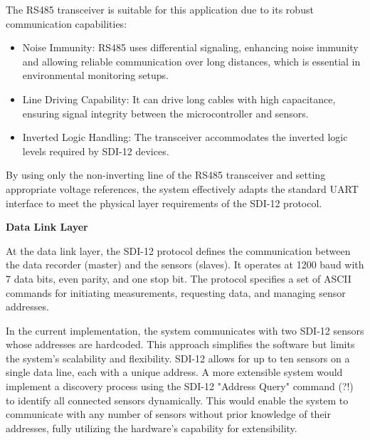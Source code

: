 The RS485 transceiver is suitable for this application due to its robust communication capabilities:

\begin{itemize}
    \item Noise Immunity: RS485 uses differential signaling, enhancing noise immunity and allowing 
    reliable communication over long distances, which is essential in environmental monitoring setups.
    \item Line Driving Capability: It can drive long cables with high capacitance, ensuring signal 
    integrity between the microcontroller and sensors.
    \item Inverted Logic Handling: The transceiver accommodates the inverted logic levels required by SDI-12 devices.
\end{itemize}

By using only the non-inverting line of the RS485 transceiver and setting appropriate voltage references, 
the system effectively adapts the standard UART interface to meet the physical layer requirements of the SDI-12 protocol.


\textbf{Data Link Layer}

At the data link layer, the SDI-12 protocol defines the communication between the data recorder 
(master) and the sensors (slaves). It operates at 1200 baud with 7 data bits, even parity, and one 
stop bit. The protocol specifies a set of ASCII commands for initiating measurements, requesting 
data, and managing sensor addresses.

In the current implementation, the system communicates with two SDI-12 sensors whose addresses are 
hardcoded. This approach simplifies the software but limits the system's scalability and flexibility. 
SDI-12 allows for up to ten sensors on a single data line, each with a unique address. A more extensible 
system would implement a discovery process using the SDI-12 "Address Query" command (?!) to identify 
all connected sensors dynamically. This would enable the system to communicate with any number of sensors 
without prior knowledge of their addresses, fully utilizing the hardware's capability for extensibility.


